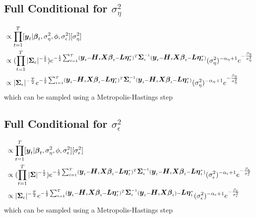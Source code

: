 \documentclass[fleqn]{article}
\def\bm#1{\mbox{\boldmath $#1$}}
\begin{document}
\subsection{Full Conditional for $\sigma^2_\eta$}
%
\begin{align*}
[\sigma^2_\eta | \cdot] & \propto \prod_{t = 1}^T [\bm{y}_t | \bm{\beta}_t, \sigma^2_\eta, \phi, \sigma^2_\epsilon] [\sigma^2_\eta]\\
%
& \propto (\prod_{t = 1}^T |\bm{\Sigma}_\epsilon |^{ - \frac{1} {2}}) e^{ - \frac{1} {2} \sum_{t = 1}^T (\bm{y}_t - \bm{H}_t \bm{X} \bm{\beta}_t - \bm{L} \bm{\eta}^*_t)^T \bm{\Sigma}_\epsilon^{ - 1} (\bm{y}_t - \bm{H}_t \bm{X} \bm{\beta}_t - \bm{L} \bm{\eta}^*_t)} (\sigma^2_\eta)^{ - \alpha_\eta + 1} e^{ - \frac{\beta_\eta} {\sigma^2_\eta}}\\
%
& \propto |\bm{\Sigma}_\epsilon |^{ - \frac{T} {2}} e^{ - \frac{1} {2} \sum_{t = 1}^T (\bm{y}_t - \bm{H}_t \bm{X} \bm{\beta}_t - \bm{L} \bm{\eta}^*_t)^T \bm{\Sigma}_\epsilon^{ - 1} (\bm{y}_t - \bm{H}_t \bm{X} \bm{\beta}_t - \bm{L} \bm{\eta}^*_t)} (\sigma^2_\eta)^{ - \alpha_\eta + 1} e^{ - \frac{\beta_\eta} {\sigma^2_\eta}}\\
\end{align*}
% 
which can be sampled using a Metropolis-Hastings step
%
\subsection{Full Conditional for $\sigma^2_\epsilon$}
%
\begin{align*}
[\sigma^2_\epsilon | \cdot] & \propto \prod_{t = 1}^T [\bm{y}_t | \bm{\beta}_t, \sigma^2_\eta, \phi, \sigma^2_\epsilon] [\sigma^2_\epsilon]\\
%
& \propto (\prod_{t = 1}^T |\bm{\Sigma} |^{ - \frac{1} {2}}) e^{ - \frac{1} {2} \sum_{t = 1}^T (\bm{y}_t - \bm{H}_t \bm{X} \bm{\beta}_t - \bm{L} \bm{\eta}^*_t)^T \bm{\Sigma}_\epsilon^{ - 1} (\bm{y}_t - \bm{H}_t \bm{X} \bm{\beta}_t - \bm{L} \bm{\eta}^*_t)} (\sigma^2_\epsilon)^{ - \alpha_\epsilon + 1} e^{ - \frac{\beta_\epsilon} {\sigma^2_\epsilon}}\\
%
& \propto |\bm{\Sigma}_\epsilon |^{ - \frac{T} {2}} e^{ - \frac{1} {2} \sum_{t = 1}^T (\bm{y}_t - \bm{H}_t \bm{X} \bm{\beta}_t - \bm{L} \bm{\eta}^*_t)^T \bm{\Sigma}_\epsilon^{ - 1} (\bm{y}_t - \bm{H}_t \bm{X} \bm{\beta}_t) - \bm{L} \bm{\eta}^*_t} (\sigma^2_\epsilon)^{ - \alpha_\epsilon + 1} e^{ - \frac{\beta_\epsilon} {\sigma^2_\epsilon}}\\
\end{align*}
% 
which can be sampled using a Metropolis-Hastings step
%
\end{document}
